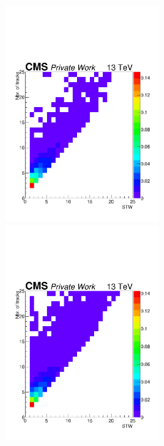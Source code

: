 \documentclass{cernatlasnote}
\begin{document}
\begin{figure}[ht]
\includegraphics[height=8cm, width=9cm, trim= 0cm 0cm 0cm 0cm,clip]{images/VTXBDT/STW_Ntrks_200_180_100.pdf}\includegraphics[height=8cm, width=9cm, trim= 0cm 0cm 0cm 0cm,clip]{images/VTXBDT/STW_Ntrks_300_180_100.pdf}

\end{figure}
\end{document}
